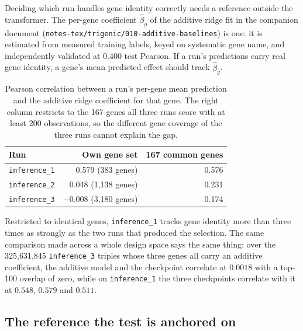 Deciding which run handles gene identity correctly needs a reference outside the
transformer. The per-gene coefficient $\hat{\beta}_g$ of the additive ridge fit
in the companion document (\texttt{notes-tex/trigenic/010-additive-baselines}) is one: it
is estimated from measured training labels, keyed on systematic gene name, and
independently validated at 0.400 test Pearson. If a run's predictions carry
real gene identity, a gene's mean predicted effect should track
$\hat{\beta}_g$.

\begin{table}[htbp]
\centering
\begin{tabular}{lrr}
\hline
Run & Own gene set & 167 common genes \\
\hline
\texttt{inference\_1} & 0.579 (383 genes) & 0.576 \\
\texttt{inference\_2} & 0.048 (1{,}138 genes) & 0.231 \\
\texttt{inference\_3} & $-0.008$ (3{,}180 genes) & 0.174 \\
\hline
\end{tabular}
\caption{Pearson correlation between a run's per-gene mean prediction and the
additive ridge coefficient for that gene. The right column restricts to the 167
genes all three runs score with at least 200 observations, so the different gene
coverage of the three runs cannot explain the gap.}
\label{tab:anchor}
\end{table}

Restricted to identical genes, \texttt{inference\_1} tracks gene identity more
than three times as strongly as the two runs that produced the selection. The
same comparison made across a whole design space says the same thing: over the
325{,}631{,}845 \texttt{inference\_3} triples whose three genes all carry an
additive coefficient, the additive model and the checkpoint correlate at
$0.0018$ with a top-100 overlap of zero, while on \texttt{inference\_1} the three
checkpoints correlate with it at $0.548$, $0.579$ and $0.511$.


\subsection{The reference the test is anchored on}

